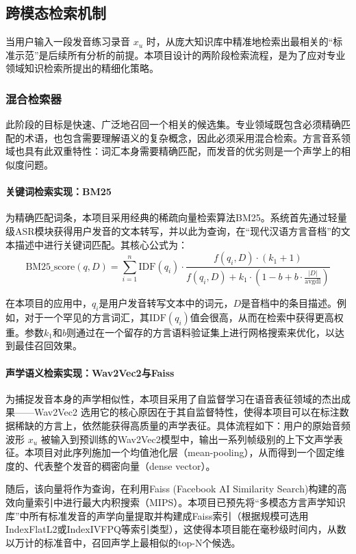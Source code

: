 \subsection{跨模态检索机制}
当用户输入一段发音练习录音 $x_u$ 时，从庞大知识库中精准地检索出最相关的“标准示范”是后续所有分析的前提。本项目设计的两阶段检索流程，是为了应对专业领域知识检索所提出的精细化策略。

\subsubsection{混合检索器}
此阶段的目标是快速、广泛地召回一个相关的候选集。专业领域既包含必须精确匹配的术语，也包含需要理解语义的复杂概念，因此必须采用混合检索。方言音系领域也具有此双重特性：词汇本身需要精确匹配，而发音的优劣则是一个声学上的相似度问题。

\paragraph{关键词检索实现：BM25}
为精确匹配词条，本项目采用经典的稀疏向量检索算法BM25。系统首先通过轻量级ASR模块获得用户发音的文本转写，并以此为查询，在“现代汉语方言音档”的文本描述中进行关键词匹配。其核心公式为：
\begin{equation}
\text{BM25\_score}(q, D) = \sum_{i=1}^{n} \text{IDF}(q_i) \cdot \frac{f(q_i, D) \cdot (k_1 + 1)}{f(q_i, D) + k_1 \cdot (1 - b + b \cdot \frac{|D|}{\text{avgdl}})}
\end{equation}

在本项目的应用中，$q_i$是用户发音转写文本中的词元，$D$是音档中的条目描述。例如，对于一个罕见的方言词汇，其$\text{IDF}(q_i)$值会很高，从而在检索中获得更高权重。参数$k_1$和$b$则通过在一个留存的方言语料验证集上进行网格搜索来优化，以达到最佳召回效果。

\paragraph{声学语义检索实现：Wav2Vec2与Faiss}
为捕捉发音本身的声学相似性，本项目采用了自监督学习在语音表征领域的杰出成果——Wav2Vec2 选用它的核心原因在于其自监督特性，使得本项目可以在标注数据稀缺的方言上，依然能获得高质量的声学表征。具体流程如下：用户的原始音频波形 $x_u$ 被输入到预训练的Wav2Vec2模型中，输出一系列帧级别的上下文声学表征。本项目对此序列施加一个均值池化层（mean-pooling），从而得到一个固定维度的、代表整个发音的稠密向量（dense vector）。

随后，该向量将作为查询，在利用Faiss (Facebook AI Similarity Search)构建的高效向量索引中进行最大内积搜索（MIPS）。本项目已预先将“多模态方言声学知识库”中所有标准发音的声学向量提取并构建成Faiss索引（根据规模可选用IndexFlatL2或IndexIVFPQ等索引类型），这使得本项目能在毫秒级时间内，从数以万计的标准音中，召回声学上最相似的top-N个候选。

